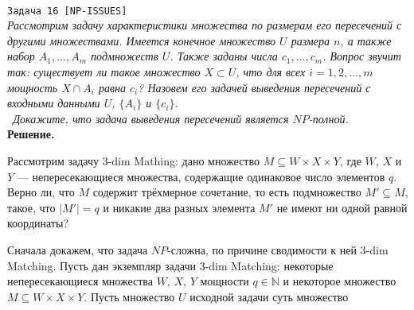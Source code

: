 \documentclass[10pt]{article}
\begin{document}
\ \\[0.5 cm]
{\large\texttt{Задача 16 [NP-ISSUES]}}
\ \\[0.2cm]
\textit{Рассмотрим задачу характеристики множества по размерам его пересечений
с другими множествами. Имеется конечное множество $U$ размера $n$, а также
набор $A_1, \dots, A_m$ подмножеств $U$. Также заданы числа $c_1, \dots, c_m$. Вопрос звучит так: существует ли такое множество $X\subset U$, что для всех $i = 1, 2, \dots, m$ мощность $X \cap A_i$ равна $c_i$? Назовем его задачей выведения пересечений с входными данными $U$, $\{A_i\}$ и $\{c_i\}$.
\\ \
Докажите, что задача выведения пересечений является $NP$-полной.
}
\ \\[0.2cm]
\textbf{Решение.} 

\par Рассмотрим задачу 3-dim Mathing: дано множество  $M \subseteq W\times X\times Y$, где $W$, $X$ и $Y$ --- непересекающиеся множества, содержащие одинаковое число элементов $q$. Верно ли, что $M$ содержит трёхмерное сочетание, то есть подмножество $M'\subseteq M$, такое, что $|M'|=q$ и никакие два разных элемента $M'$ не имеют ни одной равной координаты?
\medskip\par
Сначала докажем, что задача $NP$-сложна, по причине сводимости к ней 3-dim Matching. Пусть дан экземпляр задачи 3-dim Matching: некоторые непересекающиеся множества $W$, $X$, $Y$ мощности $q\in\mathbb{N}$ и некоторое множество $M\subseteq W\times X\times Y$. Пусть множество $U$ исходной задачи суть множество 
\end{document}
